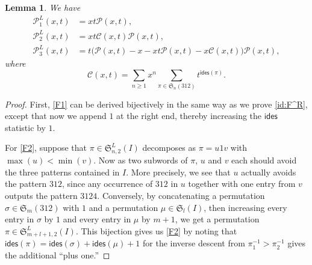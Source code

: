 \documentclass[reqno]{amsart}
\numberwithin{equation}{section}
\theoremstyle{plain}
\newtheorem{lemma}[theorem]{Lemma}
\theoremstyle{definition}
\theoremstyle{named}
\newcommand{\fS}{\mathfrak{S}}
\newcommand{\ides}{\mathsf{ides}}
\newcommand{\cC}{\mathcal{C}}
\newcommand{\cP}{\mathcal{P}}
\begin{document}
\begin{lemma}\label{lem:F123}
	We have
	\begin{align}
		\cP_1^L(x,t) &= xt\cP(x,t),\label{F1}\\
		\cP_2^L(x,t) &= xt\cC(x,t)\cP(x,t),\label{F2}\\
		\cP_3^L(x,t) &= t\big(\cP(x,t)-x-xt\cP(x,t)-x\cC(x,t)\big)\cP(x,t),\label{F3}
	\end{align}
	where
	$$\cC(x,t)=\sum_{n\ge 1}x^n\sum_{\pi\in \fS_n(312)}t^{\ides(\pi)}.$$
\end{lemma}

\begin{proof}
	First, \eqref{F1} can be derived bijectively in the same way as we prove \eqref{id:F^R}, except that now we append $1$ at the right end, thereby increasing the $\ides$ statistic by $1$.
	
	For \eqref{F2}, suppose that $\pi\in\fS_{n,2}^L(I)$ decomposes as $\pi=u 1 v$ with $\max(u)<\min(v)$. Now as two subwords of $\pi$, $u$ and $v$ each should avoid the three patterns contained in $I$. More precisely, we see that $u$ actually avoids the pattern $312$, since any occurrence of $312$ in $u$ together with one entry from $v$ outputs the pattern $3124$. Conversely, by concatenating a permutation $\sigma\in\fS_m(312)$ with $1$ and a permutation $\mu\in\fS_l(I)$, then increasing every entry in $\sigma$ by $1$ and every entry in $\mu$ by $m+1$, we get a permutation $\pi\in\fS_{m+l+1,2}^L(I)$. This bijection gives us \eqref{F2} by noting that $\ides(\pi)=\ides(\sigma)+\ides(\mu)+1$ for the inverse descent from $\pi_1^{-1}>\pi_2^{-1}$ gives the additional ``plus one.''
	

\end{proof}
\end{document}
